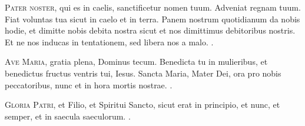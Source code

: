 \documentclass[20pt]{extarticle}
\begin{document}
    \begin{center}
        \signumcrucis
    \end{center}

    \lettrine[lines=3]{P}{ater noster,} qui es in caelis,
    sanctificetur nomen tuum.
    Adveniat regnam tuum.
    Fiat voluntas tua sicut in caelo et in terra.
    Panem nostrum quotidianum da nobis hodie,
    et dimitte nobis debita nostra
    sicut et nos dimittimus debitoribus nostris.
    Et ne nos inducas in tentationem, sed libera nos a malo.
    \amen.

    \begin{center}
    \end{center}

    \lettrine[lines=3]{A}{ve Maria,} gratia plena,
    Dominus tecum.
    Benedicta tu in mulieribus,
    et benedictus fructus ventris tui, Iesus.
    Sancta Maria, Mater Dei,
    ora pro nobis peccatoribus,
    nunc et in hora mortis nostrae.
    \amen.

    \begin{center}
    \end{center}

    \lettrine[lines=3]{G}{loria Patri}, et Filio, et Spiritui Sancto,
    sicut erat in principio, et nunc, et semper, et in saecula saeculorum.
    \amen.

    \begin{center}
        \signumcrucis
    \end{center}
\end{document}
